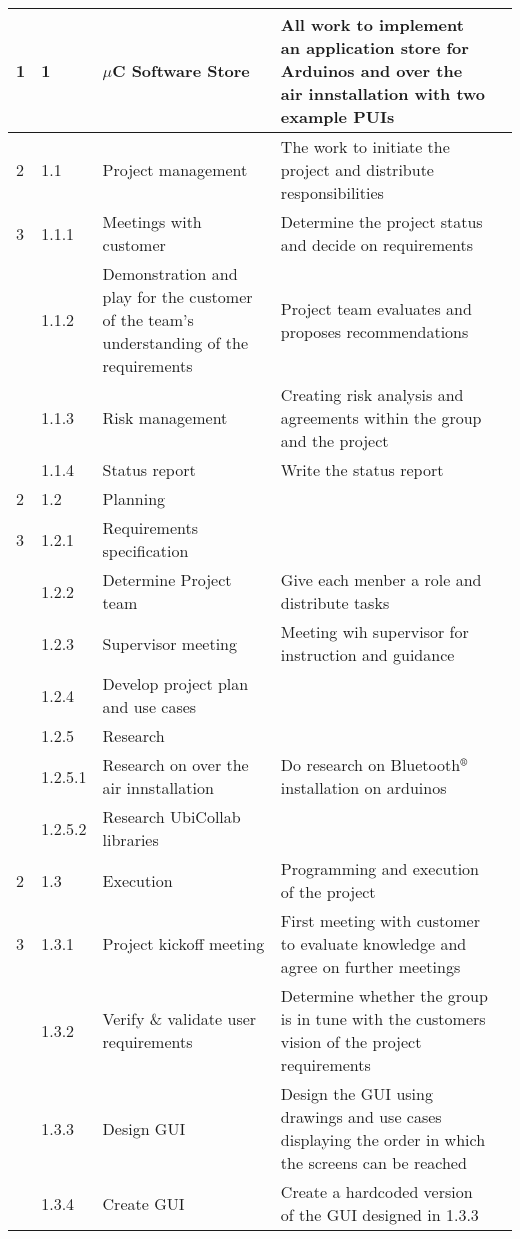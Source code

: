 \begin{longtable}{|m{}|m{}|m{}|m{}|m{}|}
	1 & 1 & $\mu$C Software Store & All work to implement an application store for Arduinos and over the air innstallation with two example PUIs & \\
\hline
	2 & 1.1 & Project management & The work to initiate the project and distribute responsibilities & \\
\hline
	3 & 1.1.1 & Meetings with customer & Determine the project status and decide on requirements & \\
\hline
	 & 1.1.2 & Demonstration and play for the customer of the team's understanding of the requirements & Project team evaluates and proposes recommendations & \\
\hline
	 & 1.1.3 & Risk management & Creating risk analysis and agreements within the group and the project & \\
\hline
	 & 1.1.4 & Status report & Write the status report & \\
\hline
	2 & 1.2 & Planning & & \\
\hline
	3 & 1.2.1 & Requirements specification & & \\
\hline
	 & 1.2.2 & Determine Project team & Give each menber a role and distribute tasks & \\
\hline
	 & 1.2.3 & Supervisor meeting & Meeting wih supervisor for instruction and guidance & \\
\hline
	 & 1.2.4 & Develop project plan and use cases & & \\
\hline
	 & 1.2.5 & Research & & \\
\hline
	 & 1.2.5.1 & Research on over the air innstallation & Do research on Bluetooth$\textsuperscript{\textregistered}$ installation on arduinos & \\
\hline
	 & 1.2.5.2 & Research UbiCollab libraries & & \\
\hline
	2 & 1.3 & Execution & Programming and execution of the project & \\
\hline
	3 & 1.3.1 & Project kickoff meeting & First meeting with customer to evaluate knowledge and agree on further meetings & \\
\hline
	 & 1.3.2 & Verify \& validate user requirements & Determine whether the group is in tune with the customers vision of the project requirements & \\
\hline
	 & 1.3.3 & Design GUI & Design the GUI using drawings and use cases displaying the order in which the screens can be reached & \\
\hline	  
	 & 1.3.4 & Create GUI & Create a hardcoded version of the GUI designed in 1.3.3 & \\

\end{longtable}
